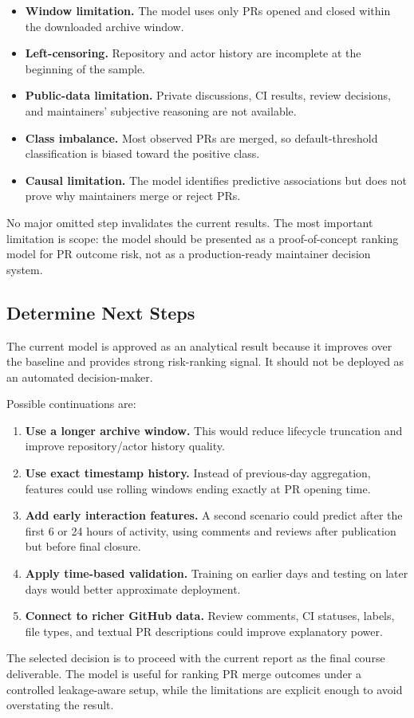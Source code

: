 \begin{itemize}
    \item \textbf{Window limitation.} The model uses only PRs opened and closed within the downloaded archive window.
    \item \textbf{Left-censoring.} Repository and actor history are incomplete at the beginning of the sample.
    \item \textbf{Public-data limitation.} Private discussions, CI results, review decisions, and
        maintainers' subjective reasoning are not available.
    \item \textbf{Class imbalance.} Most observed PRs are merged, so default-threshold classification is
        biased toward the positive class.
    \item \textbf{Causal limitation.} The model identifies predictive associations but does not prove why
        maintainers merge or reject PRs.
\end{itemize}

No major omitted step invalidates the current results. The most important limitation is scope: the model
should be presented as a proof-of-concept ranking model for PR outcome risk, not as a production-ready
maintainer decision system.

\subsection{Determine Next Steps}

The current model is approved as an analytical result because it improves over the baseline and provides
strong risk-ranking signal. It should not be deployed as an automated decision-maker.

Possible continuations are:

\begin{enumerate}
    \item \textbf{Use a longer archive window.} This would reduce lifecycle truncation and improve
        repository/actor history quality.
    \item \textbf{Use exact timestamp history.} Instead of previous-day aggregation, features could use
        rolling windows ending exactly at PR opening time.
    \item \textbf{Add early interaction features.} A second scenario could predict after the first 6 or 24
        hours of activity, using comments and reviews after publication but before final closure.
    \item \textbf{Apply time-based validation.} Training on earlier days and testing on later days would
        better approximate deployment.
    \item \textbf{Connect to richer GitHub data.} Review comments, CI statuses, labels, file types, and
        textual PR descriptions could improve explanatory power.
\end{enumerate}

The selected decision is to proceed with the current report as the final course deliverable. The model is
useful for ranking PR merge outcomes under a controlled leakage-aware setup, while the limitations are
explicit enough to avoid overstating the result.
